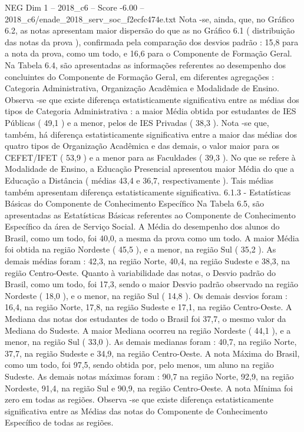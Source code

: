 \begin{textsample}{NEG Dim 1 – 2018\_c6 – Score -6.00 – 2018\_c6/enade\_2018\_serv\_soc\_f2ecfc474e.txt}
Nota -se, ainda, que, no Gráfico 6.2, as notas apresentam maior dispersão do que as no Gráfico 6.1 ( distribuição das notas da prova ), confirmada pela comparação dos desvios padrão : 15,8 para a nota da prova, como um todo, e 16,6 para o Componente de Formação Geral.
Na Tabela 6.4, são apresentadas as informações referentes ao desempenho dos concluintes do Componente de Formação Geral, em diferentes agregações : Categoria Administrativa, Organização Acadêmica e Modalidade de Ensino.
Observa -se que existe diferença estatisticamente significativa entre as médias dos tipos de Categoria Administrativa : a maior Média obtida por estudantes de IES Públicas ( 49,1 ) e a menor, pelos de IES Privadas ( 38,3 ).
Nota -se que, também, há diferença estatisticamente significativa entre a maior das médias dos quatro tipos de Organização Acadêmica e das demais, o valor maior para os CEFET/IFET ( 53,9 ) e a menor para as Faculdades ( 39,3 ).
No que se refere à Modalidade de Ensino, a Educação Presencial apresentou maior Média do que a Educação a Distância ( médias 43,4 e 36,7, respectivamente ).
Tais médias também apresentam diferença estatisticamente significativa. 6.1.3 - Estatísticas Básicas do Componente de Conhecimento Específico Na Tabela 6.5, são apresentadas as Estatísticas Básicas referentes ao Componente de Conhecimento Específico da área de Serviço Social.
A Média do desempenho dos alunos do Brasil, como um todo, foi 40,0, a mesma da prova como um todo.
A maior Média foi obtida na região Nordeste ( 45,5 ), e a menor, na região Sul ( 35,2 ).
As demais médias foram : 42,3, na região Norte, 40,4, na região Sudeste e 38,3, na região Centro-Oeste.
Quanto à variabilidade das notas, o Desvio padrão do Brasil, como um todo, foi 17,3, sendo o maior Desvio padrão observado na região Nordeste ( 18,0 ), e o menor, na região Sul ( 14,8 ).
Os demais desvios foram : 16,4, na região Norte, 17,8, na região Sudeste e 17,1, na região Centro-Oeste.
A Mediana das notas dos estudantes de todo o Brasil foi 37,7, o mesmo valor da Mediana do Sudeste.
A maior Mediana ocorreu na região Nordeste ( 44,1 ), e a menor, na região Sul ( 33,0 ).
As demais medianas foram : 40,7, na região Norte, 37,7, na região Sudeste e 34,9, na região Centro-Oeste.
A nota Máxima do Brasil, como um todo, foi 97,5, sendo obtida por, pelo menos, um aluno na região Sudeste.
As demais notas máximas foram : 90,7 na região Norte, 92,9, na região Nordeste, 91,4, na região Sul e 90,9, na região Centro-Oeste.
A nota Mínima foi zero em todas as regiões.
Observa -se que existe diferença estatisticamente significativa entre as Médias das notas do Componente de Conhecimento Específico de todas as regiões.

\end{textsample}
